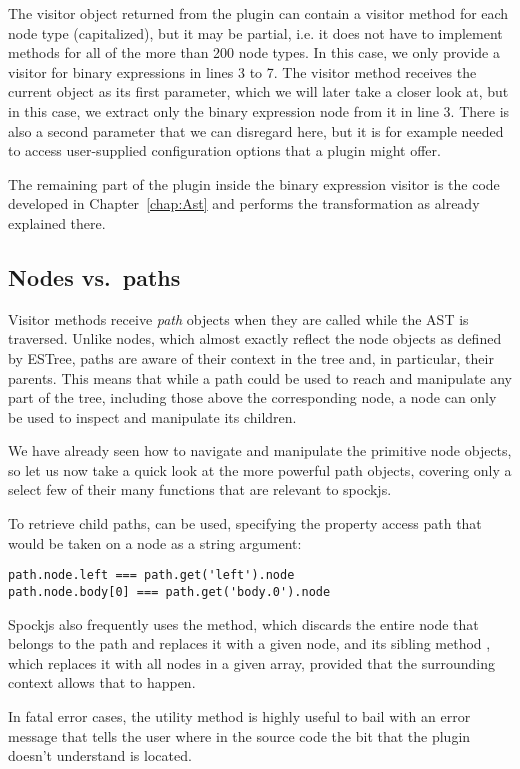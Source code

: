 The visitor object returned from the plugin
can contain a visitor method for each node type (capitalized),
but it may be partial, i.e.
it does not have to implement methods for all of the more than 200 node types.
In this case, we only provide a visitor for binary expressions in lines 3 to 7.
The visitor method receives the current  object as its first parameter,
which we will later take a closer look at,
but in this case,
we extract only the binary expression node from it in line 3.
There is also a second  parameter
that we can disregard here, but it is for example needed
to access user-supplied configuration options that a plugin might offer.

The remaining part of the plugin inside the binary expression visitor
is the code developed in Chapter~\ref{chap:Ast}
and performs the transformation as already explained there.

\subsection{Nodes vs.\ paths}
Visitor methods receive \textit{path} objects when they are called while the AST is traversed.
Unlike nodes, which almost exactly reflect the node objects as defined by ESTree,
paths are aware of their context in the tree and, in particular, their parents.
This means that while a path could be used to reach and manipulate any part of the tree,
including those above the corresponding node,
a node can only be used to inspect and manipulate its children.

We have already seen how to navigate and manipulate the primitive node objects,
so let us now take a quick look at the more powerful path objects,
covering only a select few of their many functions that are relevant to spockjs.

To retrieve child paths,  can be used,
specifying the property access path that would be taken on a node as a string argument:
\begin{verbatim}
path.node.left === path.get('left').node
path.node.body[0] === path.get('body.0').node
\end{verbatim}

Spockjs also frequently uses the  method,
which discards the entire node that belongs to the path
and replaces it with a given node,
and its sibling method ,
which replaces it with all nodes in a given array,
provided that the surrounding context allows that to happen.

In fatal error cases, the utility method 
is highly useful to bail with an error message
that tells the user where in the source code
the bit that the plugin doesn't understand is located.
